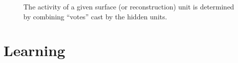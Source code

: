 \begin{figure}[htb]
\begin{center}
\end{center}
\caption{%
The activity of a given surface (or reconstruction) unit is determined by combining ``votes'' cast by the hidden units.}
\label{fig:voting}
\end{figure}

\section{Learning}
\label{sec:mcmm-learning}

